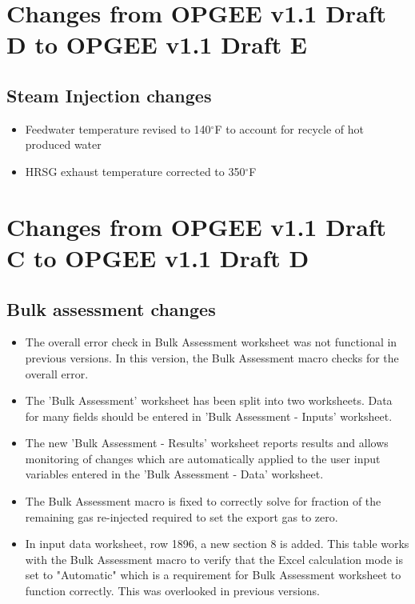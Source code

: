 \documentclass[11pt]{report}
\begin{document}
{{{{\begin{itemize}
\end{itemize}	






\section{Changes from OPGEE v1.1 Draft D to OPGEE v1.1 Draft E}
																					
\subsection{Steam Injection changes	}
	\begin{itemize}
	\item Feedwater temperature revised to 140$^\circ$F to account for recycle of hot produced water	
	\item HRSG exhaust temperature corrected to 350$^\circ$F																			
	\end{itemize}




\section{Changes from OPGEE v1.1 Draft C to OPGEE v1.1 Draft D}

\subsection{Bulk assessment changes }
\begin{itemize}
\item The overall error check in Bulk Assessment worksheet was not functional in previous versions. In this version, the Bulk Assessment macro checks for the overall error. 
\item The 'Bulk Assessment' worksheet has been split into two worksheets. Data for many fields should be entered in 'Bulk Assessment - Inputs' worksheet.
\item The new 'Bulk Assessment - Results' worksheet reports results and allows monitoring of changes which are automatically applied to the user input variables entered in the 'Bulk Assessment - Data' worksheet.
\item The Bulk Assessment macro is fixed to correctly solve for fraction of the remaining gas re-injected required to set the export gas to zero.
\item In input data worksheet, row 1896, a new section 8 is added. This table works with the Bulk Assessment macro to verify that the Excel calculation mode is set to "Automatic" which is a requirement for Bulk Assessment worksheet to function correctly. This was overlooked in previous versions.
\end{itemize}
}}}}
\end{document}
